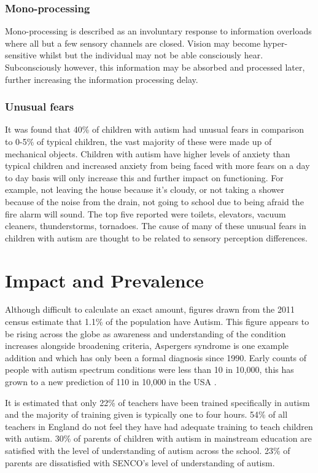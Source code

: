 \documentclass[11pt]{report}
\begin{document}
\subsubsection{Mono-processing}
Mono-processing is described as an involuntary response to information overloads where all but a few sensory channels are closed. Vision may become hyper-sensitive whilst but the individual may not be able consciously hear. Subconsciously however, this information may be absorbed and processed later, further increasing the information processing delay. 

\subsubsection{Unusual fears}
It was found that 40\% of children with autism had unusual fears in comparison to 0-5\% of typical children, the vast majority of these were made up of mechanical objects. Children with autism have higher levels of anxiety than typical children\cite{fears} and increased anxiety from being faced with more fears on a day to day basis will only increase this and further impact on functioning. For example, not leaving the house because it's cloudy, or not taking a shower because of the noise from the drain, not going to school due to being afraid the fire alarm will sound. The top five reported were toilets, elevators, vacuum cleaners, thunderstorms, tornadoes. The cause of many of these unusual fears in children with autism are thought to be related to sensory perception differences\cite{fears}.


\section{Impact and Prevalence}
Although difficult to calculate an exact amount, figures drawn from the 2011 census estimate that 1.1\% of the population have Autism\cite{nas}. This figure appears to be rising across the globe as awareness and understanding of the condition increases alongside broadening criteria\cite{increasingprevalence}, Aspergers syndrome is one example addition and which has only been a formal diagnosis since 1990. Early counts of people with autism spectrum conditions were less than 10 in 10,000, this has grown to a new prediction of 110 in 10,000 in the USA \cite{increasingprevalence}.

It is estimated that only 22\% of teachers have been trained specifically in autism and the majority of training given is typically one to four hours. 54\% of all teachers in England do not feel they have had adequate training to teach children with autism.\cite{statsandfacts} 30\% of parents of children with autism in mainstream education are satisfied with the level of understanding of autism across the school\cite{nasschool}. 23\% of parents are dissatisfied with SENCO's level of understanding of autism. 
\end{document}
